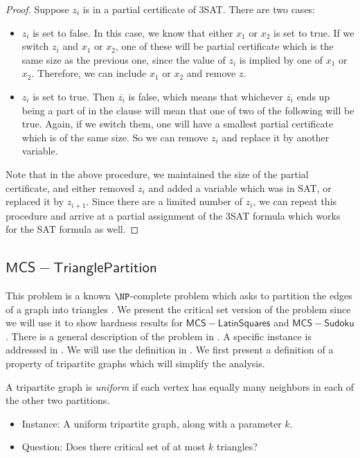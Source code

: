 \documentclass[runningheads,a4paper]{llncs}
\begin{document}
\begin{definition}
\begin{proof}
Suppose $z_i$ is in a partial certificate of 3SAT. There are two cases:
\begin{itemize}
\item $z_i$ is set to false. In this case, we know that either $x_1$ or $x_2$ is set to true. If we switch $z_i$ and $x_1$ or $x_2$, one of these will be partial certificate which is the same size as the previous one, since the value of $z_i$ is implied by one of $x_1$ or $x_2$. Therefore, we can include $x_1$ or $x_2$ and remove $z$.
\item $z_i$ is set to true. Then $\overline{z_i}$ is false, which means that whichever $\overline{z_i}$ ends up being a part of in the clause will mean that one of two of the following will be true. Again, if we switch them, one will have a smallest partial certificate which is of the same size. So we can remove $z_i$ and replace it by another variable. 
\end{itemize}
Note that in the above procedure, we maintained the size of the partial certificate, and either removed $z_i$ and added a variable which was in SAT, or replaced it by $z_{i+1}$. Since there are a limited number of $z_i$, we can repeat this procedure and arrive at a partial assignment of the 3SAT formula which works for the SAT formula as well.
\end{proof}

\subsection{$\mathsf{MCS-Triangle Partition}$}

This problem is a known $\NP$-complete problem which asks to partition the edges of a graph into triangles \cite{holyer1981np}. We present the critical set version of the problem since we will use it to show hardness results for $\mathsf{MCS-Latin Squares}$ and $\mathsf{MCS-Sudoku}$. There is a general description of the problem in \cite{holyer1981np}. A specific instance is addressed in \cite{colbourn1984complexity}. We will use the definition in \cite{colbourn1984complexity}. We first present a definition of a property of tripartite graphs which will simplify the analysis.

\begin{definition}
A tripartite graph is \emph{uniform} if each vertex has equally many neighbors in each of the other two partitions.
\end{definition}

\begin{itemize}
\item Instance: A uniform tripartite graph, along with a parameter $k$.
\item Question: Does there critical set of at most $k$ triangles?
\end{itemize}


\end{definition}
\end{document}
